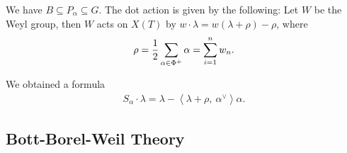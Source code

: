 We have \(B \subseteq P_\alpha \subseteq G\). The dot action is given by
the following: Let \(W\) be the Weyl group, then \(W\) acts on \(X(T)\)
by \(w\cdot \lambda = w(\lambda + \rho) - \rho\), where
\begin{align*}   \rho = {1\over 2} \sum_{\alpha\in \Phi^+} \alpha = \sum_{i=1}^n w_n .\end{align*}

We obtained a formula
\begin{align*}   S_\alpha \cdot \lambda = \lambda - {\left\langle {\lambda  + \rho},~{\alpha^\vee} \right\rangle} \alpha .\end{align*}

\hypertarget{bott-borel-weil-theory}{%
\subsection{Bott-Borel-Weil Theory}\label{bott-borel-weil-theory}}

